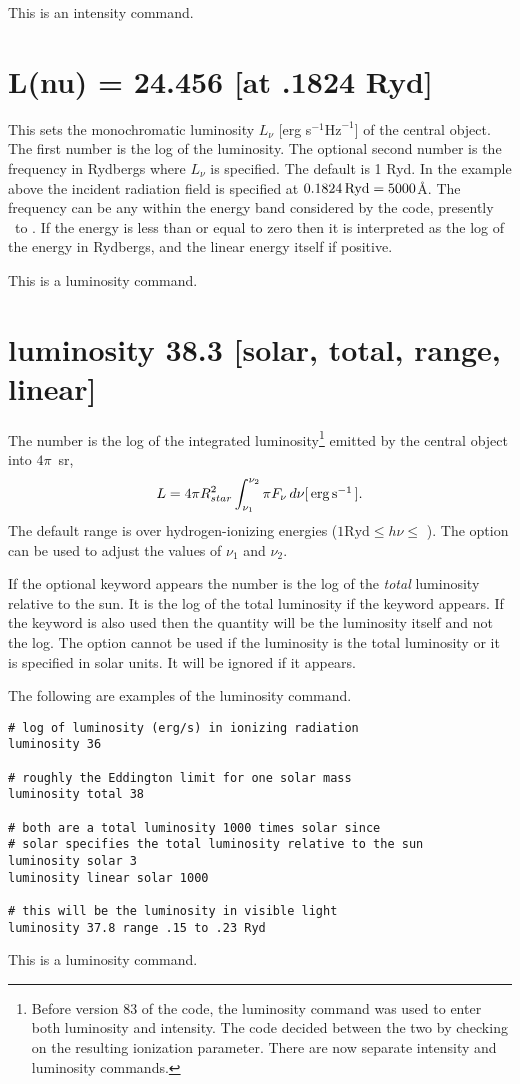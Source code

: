 This is an intensity command.

\section{L(nu) = 24.456 [at .1824 Ryd]}

This sets the monochromatic luminosity
$L_{\nu}$ [erg s$^{-1} \mathrm{Hz}^{-1}$] of the central object.
The first number is the log of the luminosity.
The optional
second number is the frequency in Rydbergs where $L_{\nu}$ is specified.  The default is 1 Ryd.
In the example above the incident radiation field is specified at
$0.1824 {\rm\thinspace Ryd} = 5000 $\AA.
The frequency can be any within the energy band considered
by the code, presently \emm\ to \egamry .  If the energy is
less than or equal to zero then it is interpreted as the log of the energy
in Rydbergs, and the linear energy itself if positive.

This is a luminosity command.
\label{sec:LuminosityCommand}

\section{luminosity 38.3 [solar, total, range, linear]}

The number is the log of the integrated luminosity\footnote{Before version 83 of the code, the luminosity command was used to
enter both luminosity and intensity.  The code decided between the two by
checking on the resulting ionization parameter.  There are now separate
intensity and luminosity commands.} emitted by the central
object into $4\pi$~sr,
\begin{equation}
L = 4 \pi R_{star}^2 \int_{\nu _1 }^{\nu _2 } {\pi F_\nu
\, d\nu } [\ergps ].%
\end{equation}
The default range is over hydrogen-ionizing energies ($1\mathrm{ Ryd} \le
h\nu\le$ \egamry ).  The  option can be used to adjust
the values of $\nu_1$ and $\nu_2$.

If the optional keyword  appears
the number is the log of the \emph{total} luminosity relative to the sun. 
It is the log of the total luminosity if the keyword  appears.
If the
 keyword is also used then the quantity will be the luminosity itself
and not the log.
The  option cannot be used if the luminosity is the
total luminosity or it is specified in solar units.
It will be ignored
if it appears.

The following are examples of the luminosity command.
\begin{verbatim}
# log of luminosity (erg/s) in ionizing radiation
luminosity 36

# roughly the Eddington limit for one solar mass
luminosity total 38

# both are a total luminosity 1000 times solar since
# solar specifies the total luminosity relative to the sun
luminosity solar 3
luminosity linear solar 1000

# this will be the luminosity in visible light
luminosity 37.8 range .15 to .23 Ryd
\end{verbatim}
This is a luminosity command.

